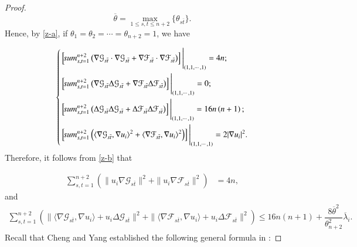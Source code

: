 \documentclass[12pt]{article}
\numberwithin{equation}{section}
\begin{document}
\begin{proof}
$$\overline{\theta}=\max_{1\leq s,t\leq n+2}\{\theta_{s\overline{t}}\}.$$
Hence, by \eqref{z-a}, if $\theta_{1}=\theta_{2}=\cdots=\theta_{n+2}=1$, we have


\begin{equation}\left\{\begin{aligned}\label{z-b}&\left[\sum^{n+2}_{s,t=1}\left(\nabla \mathcal{G}_{s\overline{t}}\cdot\nabla \mathcal{G}_{s\overline{t}}
+\nabla \mathcal{F}_{s\overline{t}}\cdot\nabla \mathcal{F}_{s\overline{t}}\right)\right]\Bigg{|}_{(1,1,\cdots,1)}=4n;
\\&
\left[\sum^{n+2}_{s,t=1}\left(\nabla \mathcal{G}_{s\overline{t}}\Delta \mathcal{G}_{s\overline{t}}+
\nabla \mathcal{F}_{s\overline{t}}\Delta \mathcal{F}_{s\overline{t}}\right)\right]\Bigg{|}_{(1,1,\cdots,1)}=0;
\\&\left[\sum^{n+2}_{s,t=1}\left(\Delta \mathcal{G}_{s\overline{t}}\Delta \mathcal{G}_{s\overline{t}}+\Delta
\mathcal{F}_{s\overline{t}}\Delta \mathcal{F}_{s\overline{t}}\right)\right]\Bigg{|}_{(1,1,\cdots,1)}=
16n\left(n + 1\right);
\\&\left[\sum^{n+2}_{s,t=1}\left(\langle\nabla \mathcal{G}_{s\overline{t}},\nabla u_{i}\rangle^{2}
+\langle\nabla \mathcal{F}_{s\overline{t}},\nabla u_{i}\rangle^{2}\right)\right]\Bigg{|}_{(1,1,\cdots,1)}=2|\nabla u_{i}|^{2}.
\end{aligned}\right.\end{equation}Therefore, it follows from \eqref{z-b} that

\begin{equation}\begin{aligned}\label{sum-pq-4}
\sum^{n+2}_{s,t=1}\left(\|u_{i}\nabla \mathcal{G}_{s\overline{t}}\|^{2}+\|u_{i}\nabla \mathcal{F}_{s\overline{t}}\|^{2}\right)&=
4n,
\end{aligned}\end{equation}and
\begin{equation}\begin{aligned}\label{sum-pq-5}
\sum^{n+2}_{s,t=1}\left(\|\langle\nabla \mathcal{G}_{s\overline{t}},\nabla u_{i}\rangle+u_{i}\Delta \mathcal{G}_{s\overline{t}}\|^{2}+\|\langle\nabla \mathcal{F}_{s\overline{t}},\nabla u_{i}\rangle+u_{i}\Delta \mathcal{F}_{s\overline{t}}\|^{2}\right)
\leq16n(n+1)+\dfrac{8\overline{\theta}^{2}}{\theta^{2}_{n+2}}\overline{\lambda}_{i}.
\end{aligned}\end{equation}
Recall that Cheng and Yang established the following general formula in \cite{CY2}:


\end{proof}
\end{document}
